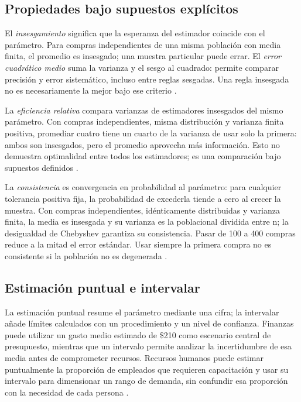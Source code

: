 {\subsection{Propiedades bajo supuestos explícitos}
El \textit{insesgamiento} significa que la esperanza del estimador coincide con el parámetro. Para compras independientes de una misma población con media finita, el promedio es insesgado; una muestra particular puede errar. El \textit{error cuadrático medio} suma la varianza y el sesgo al cuadrado: permite comparar precisión y error sistemático, incluso entre reglas sesgadas. Una regla insesgada no es necesariamente la mejor bajo ese criterio \citep[sec. 8.2]{wackerly2010}.

La \textit{eficiencia relativa} compara varianzas de estimadores insesgados del mismo parámetro. Con compras independientes, misma distribución y varianza finita positiva, promediar cuatro tiene un cuarto de la varianza de usar solo la primera: ambos son insesgados, pero el promedio aprovecha más información. Esto no demuestra optimalidad entre todos los estimadores; es una comparación bajo supuestos definidos \citep[sec. 9.2]{wackerly2010}.

La \textit{consistencia} es convergencia en probabilidad al parámetro: para cualquier tolerancia positiva fija, la probabilidad de excederla tiende a cero al crecer la muestra. Con compras independientes, idénticamente distribuidas y varianza finita, la media es insesgada y su varianza es la poblacional dividida entre n; la desigualdad de Chebyshev garantiza su consistencia. Pasar de 100 a 400 compras reduce a la mitad el error estándar. Usar siempre la primera compra no es consistente si la población no es degenerada \citep[sec. 9.3]{wackerly2010}.

\subsection{Estimación puntual e intervalar}
La estimación puntual resume el parámetro mediante una cifra; la intervalar añade límites calculados con un procedimiento y un nivel de confianza. Finanzas puede utilizar un gasto medio estimado de \$210 como escenario central de presupuesto, mientras que un intervalo permite analizar la incertidumbre de esa media antes de comprometer recursos. Recursos humanos puede estimar puntualmente la proporción de empleados que requieren capacitación y usar su intervalo para dimensionar un rango de demanda, sin confundir esa proporción con la necesidad de cada persona \citep{holmesBusiness2023}.

}
